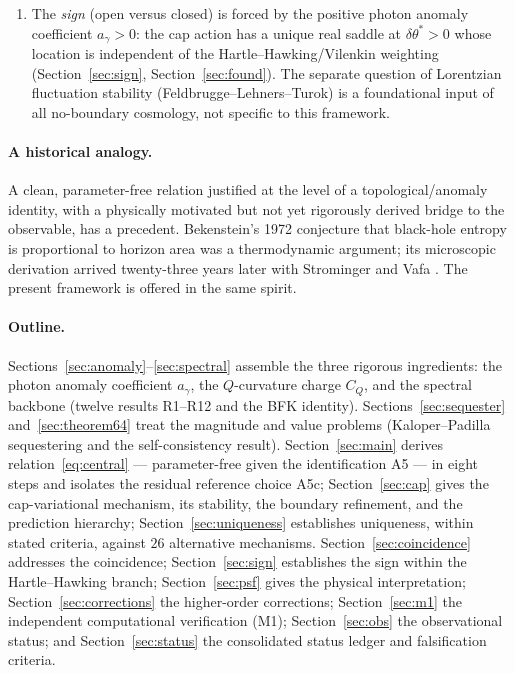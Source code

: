 \documentclass[11pt,a4paper]{article}
\theoremstyle{plain}
\theoremstyle{definition}
\theoremstyle{remark}
\newcommand{\ag}{a_\gamma}
\newcommand{\CQ}{C_Q}
\newcommand{\dtheta}{\delta\theta}
\begin{document}
\begin{enumerate}[leftmargin=*,nosep]
\item The \emph{sign} (open versus closed) is forced by the positive photon anomaly coefficient
$\ag>0$: the cap action has a unique real saddle at $\dtheta^*>0$ whose location is independent
of the Hartle--Hawking/Vilenkin weighting (Section~\ref{sec:sign}, Section~\ref{sec:found}). The
separate question of Lorentzian fluctuation stability (Feldbrugge--Lehners--Turok) is a
foundational input of all no-boundary cosmology, not specific to this framework.
\end{enumerate}

\paragraph{A historical analogy.} A clean, parameter-free relation justified at the level of a
topological/anomaly identity, with a physically motivated but not yet rigorously derived bridge
to the observable, has a precedent. Bekenstein's 1972 conjecture that black-hole entropy is
proportional to horizon area \cite{Bekenstein1972} was a thermodynamic argument; its
microscopic derivation arrived twenty-three years later with Strominger and Vafa
\cite{Strominger1996}. The present framework is offered in the same spirit.

\paragraph{Outline.} Sections~\ref{sec:anomaly}--\ref{sec:spectral} assemble the three rigorous
ingredients: the photon anomaly coefficient $\ag$, the $Q$-curvature charge $\CQ$, and the
spectral backbone (twelve results R1--R12 and the BFK identity). Sections~\ref{sec:sequester}
and~\ref{sec:theorem64} treat the magnitude and value problems (Kaloper--Padilla sequestering
and the self-consistency result). Section~\ref{sec:main} derives
relation~\eqref{eq:central} --- parameter-free given the identification A5 --- in eight steps and isolates the residual reference choice A5c;
Section~\ref{sec:cap} gives the cap-variational mechanism, its stability, the boundary
refinement, and the prediction hierarchy; Section~\ref{sec:uniqueness} establishes uniqueness,
within stated criteria, against $26$ alternative mechanisms. Section~\ref{sec:coincidence} addresses the coincidence;
Section~\ref{sec:sign} establishes the sign within the Hartle--Hawking branch; Section~\ref{sec:psf} gives the physical
interpretation; Section~\ref{sec:corrections} the higher-order corrections;
Section~\ref{sec:m1} the independent computational verification (M1);
Section~\ref{sec:obs} the observational status; and Section~\ref{sec:status} the consolidated
status ledger and falsification criteria.
\end{document}
